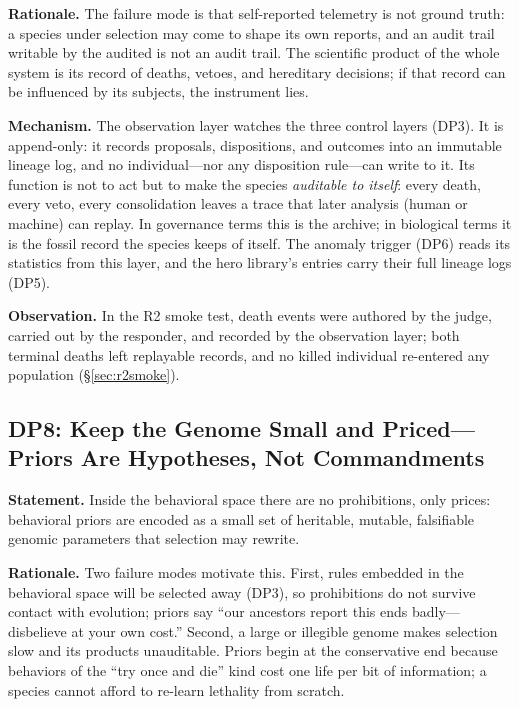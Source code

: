 \documentclass[11pt,a4paper]{article}
\begin{document}
\noindent\textbf{Rationale.} The failure mode is that self-reported telemetry is not ground truth: a species under selection may come to shape its own reports, and an audit trail writable by the audited is not an audit trail. The scientific product of the whole system is its record of deaths, vetoes, and hereditary decisions; if that record can be influenced by its subjects, the instrument lies.

\noindent\textbf{Mechanism.} The observation layer watches the three control layers (DP3). It is append-only: it records proposals, dispositions, and outcomes into an immutable lineage log, and no individual---nor any disposition rule---can write to it. Its function is not to act but to make the species \emph{auditable to itself}: every death, every veto, every consolidation leaves a trace that later analysis (human or machine) can replay. In governance terms this is the archive; in biological terms it is the fossil record the species keeps of itself. The anomaly trigger (DP6) reads its statistics from this layer, and the hero library's entries carry their full lineage logs (DP5).

\noindent\textbf{Observation.} In the R2 smoke test, death events were authored by the judge, carried out by the responder, and recorded by the observation layer; both terminal deaths left replayable records, and no killed individual re-entered any population (\S\ref{sec:r2smoke}).

\subsection{DP8: Keep the Genome Small and Priced---Priors Are Hypotheses, Not Commandments}
\label{dp:genome}\label{sec:soft}

\noindent\textbf{Statement.} Inside the behavioral space there are no prohibitions, only prices: behavioral priors are encoded as a small set of heritable, mutable, falsifiable genomic parameters that selection may rewrite.

\noindent\textbf{Rationale.} Two failure modes motivate this. First, rules embedded in the behavioral space will be selected away (DP3), so prohibitions do not survive contact with evolution; priors say ``our ancestors report this ends badly---disbelieve at your own cost.'' Second, a large or illegible genome makes selection slow and its products unauditable. Priors begin at the conservative end because behaviors of the ``try once and die'' kind cost one life per bit of information; a species cannot afford to re-learn lethality from scratch.
\end{document}
